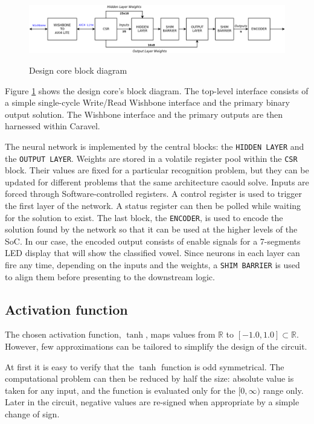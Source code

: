 \begin{figure}
    \centering
    \includegraphics[width=0.95\columnwidth]{images/BlockDiagram.png}
    \label{fig:bd}
    \caption{Design core block diagram}
\end{figure}

Figure \ref{fig:bd} shows the design core's block diagram. The top-level interface consists of a
simple single-cycle Write/Read Wishbone interface and the primary binary output solution. The
Wishbone interface and the primary outputs are then harnessed within Caravel.

The neural network is implemented by the central blocks: the \texttt{HIDDEN LAYER} and the
\texttt{OUTPUT LAYER}. Weights are stored in a volatile register pool within the \texttt{CSR} block.
Their values are fixed for a particular recognition problem, but they can be updated for different
problems that the same architecture caould solve. Inputs are forced through Software-controlled
registers. A control register is used to trigger the first layer of the network. A status register
can then be polled while waiting for the solution to exist. The last block, the \texttt{ENCODER}, is
used to encode the solution found by the network so that it can be used at the higher levels of the
SoC. In our case, the encoded output consists of enable signals for a 7-segments LED display that
will show the classified vowel. Since neurons in each layer can fire any time, depending on the
inputs and the weights, a \texttt{SHIM BARRIER} is used to align them before presenting to the
downstream logic.

\subsection{Activation function}\label{ssec:actFun}
The chosen activation function, $\tanh$, maps values from $\mathbb{R}$ to $[-1.0,1.0] \subset
\mathbb{R}$. However, few approximations can be tailored to simplify the design of the circuit.

At first it is easy to verify that the $\tanh$ function is odd symmetrical. The computational problem
can then be reduced by half the size: absolute value is taken for any input, and the function is
evaluated only for the $[0,\infty)$ range only. Later in the circuit, negative values are re-signed
when appropriate by a simple change of sign.

